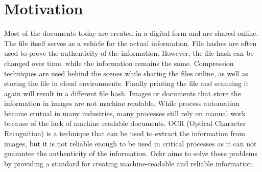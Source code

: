 \documentclass[../ockr-specification.tex]{subfiles}
\begin{document}
\section{Motivation}

Most of the documents today are created in a digital form and are shared online. 
The file itself serves as a vehicle for the actual information. File hashes are often used to prove the authenticity of the information.
However, the file hash can be changed over time, while the information remains the same. Compression techniques are used behind the scenes
while sharing the files online, as well as storing the file in cloud environments. Finally printing the file and scanning it again will result in a different file hash.
Images or documents that store the information in images are not machine readable. While process automation became crutual in many industries,
many processes still rely on manual work because of the lack of machine readable documents. OCR (Optical Character Recognition) is a technique that
can be used to extract the information from images, but it is not reliable enough to be used in critical processes as 
it can not guarantee the authenticity of the information. Ockr aims to solve these problems by providing a standard for creating machine-readable and reliable information.
\end{document}
